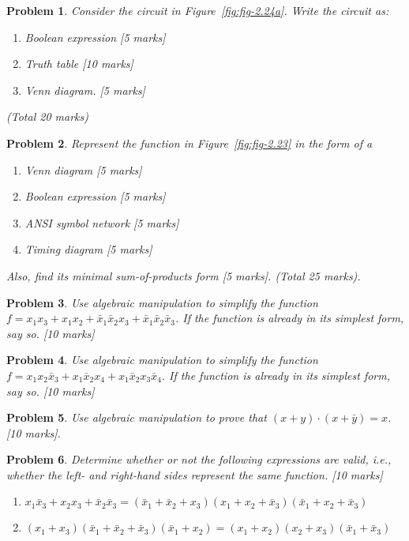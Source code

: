 \documentclass{article}
\newtheorem{prob}{Problem}
\newcommand{\bx}{\bar{x}}
\begin{document}
\begin{prob}
  Consider the circuit in Figure~\ref{fig:fig-2.24a}. Write the circuit as:
  \begin{enumerate}
    \item Boolean expression [5 marks]
    \item Truth table [10 marks]
    \item Venn diagram. [5 marks]
  \end{enumerate} (Total 20 marks)
\end{prob}

\begin{prob}
Represent the function in Figure~\ref{fig:fig-2.23} in the form of a 
\begin{enumerate}
  \item Venn diagram [5 marks]
  \item Boolean expression [5 marks]
  \item ANSI symbol network [5 marks]
  \item Timing diagram [5 marks]
\end{enumerate}
    Also, find its minimal sum-of-products form [5 marks].
    (Total 25 marks).
\end{prob}

\begin{prob}
Use algebraic manipulation to simplify the function $f = x_1x_3 + x_1x_2 + \bx_1 \bx_2 x_3 + \bx_1 \bx_2 \bx_3$. If the function is already in its simplest form, say so. [10 marks]
\end{prob}

\begin{prob}
Use algebraic manipulation to simplify the function $f = x_1 x_2\bx_3 + x_1\bx_2x_4 + x_1\bx_2 x_3\bx_4$. If the function is already in its simplest form, say so. [10 marks]
\end{prob}

\begin{prob}
Use algebraic manipulation to prove that $(x+y)\cdot(x+\bar{y}) = x$. [10 marks].
\end{prob}

\begin{prob}
Determine whether or not the following expressions are valid, i.e., whether the
left- and right-hand sides represent the same function.
[10 marks]
\begin{enumerate}
    \item $x_1 \bx_3 + x_2 x_3 + \bx_2 \bx_3 = (\bx_1 + \bx_2 + x_3)(x_1 + x_2 + \bx_3)(\bx_1 + x_2 + \bx_3)$
    \item $(x_1 + x_3)(\bx_1 + \bx_2 + \bx_3)(\bx_1 + x_2) = (x_1 + x_2)(x_2 + x_3)(\bx_1 + \bx_3)$
\end{enumerate}
\end{prob}
\end{document}
